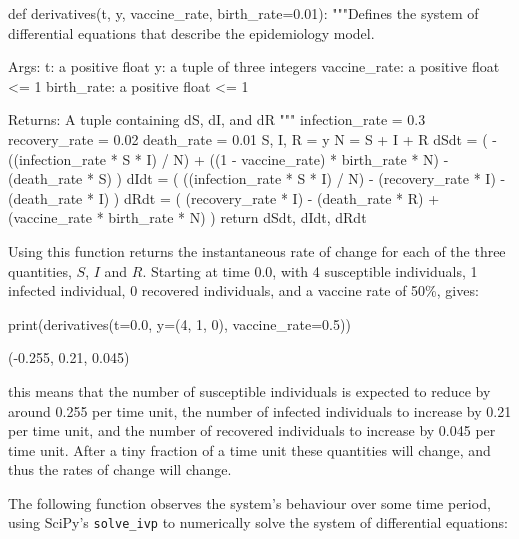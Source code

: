 \begin{pyin}
def derivatives(t, y, vaccine_rate, birth_rate=0.01):
    """Defines the system of differential equations that
    describe the epidemiology model.

    Args:
        t: a positive float
        y: a tuple of three integers
        vaccine_rate: a positive float <= 1
        birth_rate: a positive float <= 1

    Returns:
        A tuple containing dS, dI, and dR
    """
    infection_rate = 0.3
    recovery_rate = 0.02
    death_rate = 0.01
    S, I, R = y
    N = S + I + R
    dSdt = (
        -((infection_rate * S * I) / N)
        + ((1 - vaccine_rate) * birth_rate * N)
        - (death_rate * S)
    )
    dIdt = (
        ((infection_rate * S * I) / N)
        - (recovery_rate * I)
        - (death_rate * I)
    )
    dRdt = (
        (recovery_rate * I)
        - (death_rate * R)
        + (vaccine_rate * birth_rate * N)
    )
    return dSdt, dIdt, dRdt
\end{pyin}

Using this function returns the instantaneous rate of change for each of the
three quantities, $S$, $I$ and $R$. Starting at time 0.0, with 4 susceptible
individuals, 1 infected individual, 0 recovered individuals, and a vaccine rate
of 50\%, gives:

\begin{pyin}
print(derivatives(t=0.0, y=(4, 1, 0), vaccine_rate=0.5))
\end{pyin}

\begin{pyout}
(-0.255, 0.21, 0.045)
\end{pyout}

this means that the number of susceptible individuals is expected to reduce by
around 0.255 per time unit, the number of infected individuals to increase by
0.21 per time unit, and the number of recovered individuals to increase by 0.045
per time unit. After a tiny fraction of a time unit these quantities will
change, and thus the rates of change will change.

The following function observes the system's behaviour over some time period,
using SciPy's \texttt{solve_ivp} to numerically solve the system
of differential equations:

